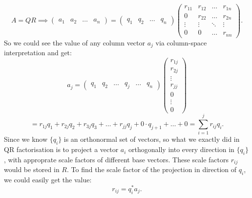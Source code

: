  \[
   A = QR \implies \begin{pmatrix} a_1 & a_2 & \ldots & a_n \end{pmatrix} = 
   \begin{pmatrix} 
     q_1 & q_2 & \ldots & q_n 
  \end{pmatrix} 
   \begin{pmatrix} 
     r_{11} & r_{12} & \ldots & r_{1n} \\ 
     0 & r_{22} & \ldots & r_{2n} \\
     \vdots & \vdots & \ddots & \vdots \\
     0 & 0 & \ldots & r_{nn}
   \end{pmatrix}  
.\] 
So we could see the value of any column vector $a_j$ via column-space interpretation and get:
\[
  a_j = 
   \begin{pmatrix} 
     q_1 & q_2 & \ldots & q_j & \ldots & q_n 
  \end{pmatrix} 
  \begin{pmatrix} r_{1j}\\ r_{2j} \\ \vdots\\ r_{jj} \\ 0 \\ \vdots \\ 0 \end{pmatrix}
\] 
\[
  = r_{1j} q_1 + r_{2j}q_2 + r_{3j}q_3 + \ldots + r_{jj}q_j + 0 \cdot q_{j + 1} + \ldots + 0
  = \sum_{i=1}^{j} r_{ij}q_i
.\] 
Since we know $ \{q_i\} $ is an orthonormal set of vectors, so what we exactly did in QR factorisation is to project a vector $a_i$ orthogonally into every direction in $ \{q_i\} $, with approprate scale factors of different base vectors. These scale factors $r_{ij}$ would be stored in $R$. To find the scale factor of the projection in direction of  $q_i$, we could easily get the value:
 \[
   r_{ij} = q_i^{*}a_j
.\] 



